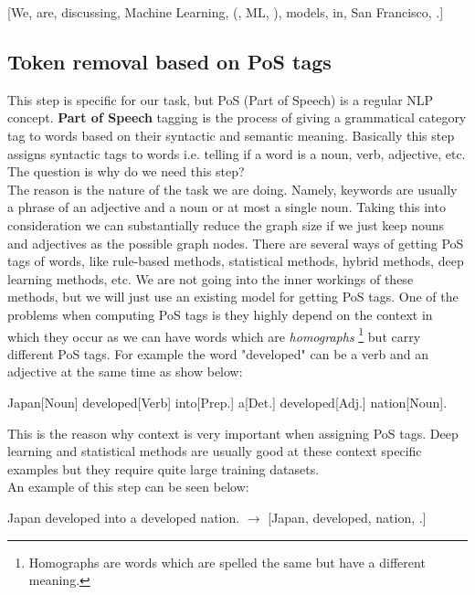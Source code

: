 \documentclass[12pt]{article}
\numberwithin{equation}{section}
\begin{document}
\begin{spacing}{1.5}
\begin{center}
		[We, are, discussing, Machine Learning, (, ML, ), models, in, San Francisco, .]
	\end{center} 
	
	\subsection{Token removal based on PoS tags}
	This step is specific for our task, but PoS (Part of Speech) is a regular NLP concept. \textbf{Part of Speech} tagging is the process of giving a grammatical category tag to words based on their syntactic and semantic meaning. Basically this step assigns syntactic tags to words i.e. telling if a word is a noun, verb, adjective, etc. The question is why do we need this step?\\
	The reason is the nature of the task we are doing. Namely, keywords are usually a phrase of an adjective and a noun or at most a single noun. Taking this into consideration we can substantially reduce the graph size if we just keep nouns and adjectives as the possible graph nodes. There are several ways of getting PoS tags of words, like rule-based methods, statistical methods, hybrid methods, deep learning methods, etc. 
	We are not going into the inner workings of these methods, but we will just use an existing model for getting PoS tags. One of the problems when computing PoS tags is they highly depend on the context in which they occur as we can have words which are \textit{homographs} \footnote{Homographs are words which are spelled the same but have a different meaning.} but carry different PoS tags. For example the word "developed" can be a verb and an adjective at the same time as show below:
	\begin{center}
		Japan[Noun] developed[Verb] into[Prep.] a[Det.] developed[Adj.] nation[Noun].
	\end{center}
	This is the reason why context is very important when assigning PoS tags. Deep learning and statistical methods are usually good at these context specific examples but they require quite large training datasets. \\
	An example of this step can be seen below:
	\begin{center}
		Japan developed into a developed nation. $\rightarrow$ [Japan, developed, nation, .]
	\end{center}	  
	

\end{spacing}
\end{document}

